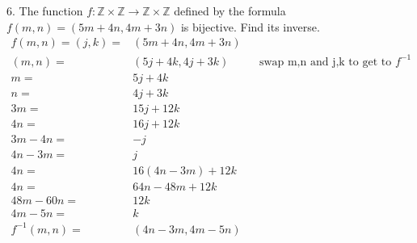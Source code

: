 \documentclass{article}
\begin{document}
\begin{exercise}{}{}
	{6. The function $f: \mathbb{Z} \times \mathbb{Z} \rightarrow
			\mathbb{Z} \times \mathbb{Z}$ defined by the formula $f(m, n)=(5 m+4 n, 4
			m+3 n)$ is bijective. Find its inverse.}
	\begin{align*}
		f(m, n)=(j, k)= & (5 m+4 n, 4 m+3 n)                                               \\
		(m, n)=         & (5 j+4 k, 4 j+3 k) &  & \text{swap m,n and j,k to get to }f^{-1} \\
		m=              & 5 j+4 k                                                          \\
		n=              & 4 j+3 k                                                          \\
		3m=             & 15 j+12 k                                                        \\
		4n=             & 16 j+12 k                                                        \\
		3m-4n=          & -j                                                               \\
		4n-3m=          & j                                                                \\
		4n=             & 16 (4n-3m)+12 k                                                  \\
		4n=             & 64n-48m+12 k                                                     \\
		48m-60n=        & 12 k                                                             \\
		4m-5n=          & k                                                                \\
		f^{-1}(m, n) =  & (4n-3m, 4m-5n)
	\end{align*}
\end{exercise}{}{}
\end{document}
